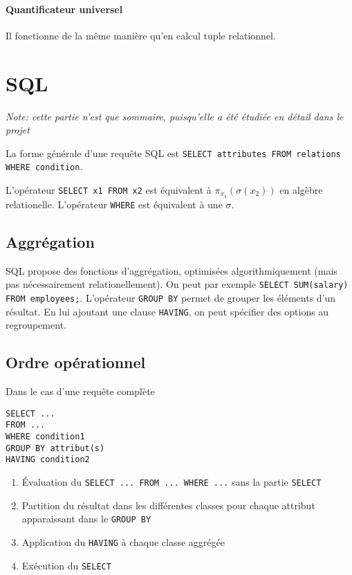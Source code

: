 \documentclass[a4paper]{article}
\begin{document}
  \paragraph{Quantificateur universel}
  Il fonctionne de la même manière qu'en calcul tuple relationnel.


\section{SQL}
\textit{Note: cette partie n'est que sommaire, puisqu'elle a été étudiée en détail dans le projet}

La forme générale d'une requête SQL est \texttt{SELECT attributes FROM relations WHERE condition}.

L'opérateur \texttt{SELECT x1 FROM x2} est équivalent à $\pi_{x_1}(\sigma(x_2))$ en algèbre relationelle.
L'opérateur \texttt{WHERE} est équivalent à une $\sigma$.

\subsection{Aggrégation}
SQL propose des fonctions d'aggrégation, optimisées algorithmiquement (mais pas
nécessairement relationellement). On peut par exemple \texttt{SELECT SUM(salary) FROM employees;}.
L'opérateur \texttt{GROUP BY} permet de grouper les éléments d'un résultat. En lui ajoutant une
clause \texttt{HAVING}, on peut spécifier des options au regroupement.

\subsection{Ordre opérationnel}
Dans le cas d'une requête complète
\begin{lstlisting}
SELECT ...
FROM ...
WHERE condition1
GROUP BY attribut(s)
HAVING condition2
\end{lstlisting}

\begin{enumerate}
  \item \'Evaluation du \texttt{SELECT ... FROM ... WHERE ...} sans la partie
        \texttt{SELECT}
  \item Partition du résultat dans les différentes classes pour chaque attribut
        apparaissant dans le \texttt{GROUP BY}
  \item Application du \texttt{HAVING} à chaque classe aggrégée
  \item Exécution du \texttt{SELECT}
\end{enumerate}
\end{document}
